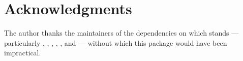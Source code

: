 \documentclass[codesnippet]{jss}
\begin{document}
\section*{Acknowledgments}


The author thanks the maintainers of the dependencies on which
 stands --- particularly 
\citep{harris2020numpy},  \citep{virtanen2020scipy},
 \citep{mckinney2010pandas},
 \citep{seabold2010statsmodels},
 \citep{vanderplas2018altair}, and
 \citep{reimers2019sbert} --- without
which this package would have been impractical.


\end{document}
